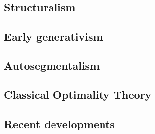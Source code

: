 
\subsection{Structuralism}               
\subsection{Early generativism}          
\subsection{Autosegmentalism}            
\subsection{Classical Optimality Theory} 
\subsection{Recent developments}         
